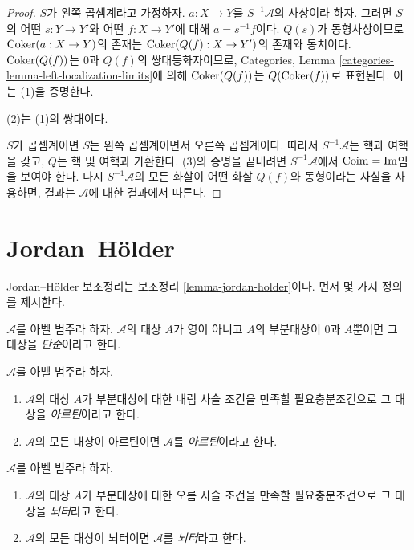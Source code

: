 \begin{proof}
$S$가 왼쪽 곱셈계라고 가정하자.
$a : X \to Y$를 $S^{-1}\mathcal{A}$의 사상이라 하자.
그러면 $S$의 어떤 $s : Y \to Y'$와 어떤 $f : X \to Y'$에 대해
$a = s^{-1}f$이다. $Q(s)$가 동형사상이므로
$\mathop{\mathrm{Coker}}(a : X \to Y)$의 존재는 $\mathop{\mathrm{Coker}}(Q(f) : X \to Y')$의 존재와
동치이다. $\mathop{\mathrm{Coker}}(Q(f))$는 $0$과 $Q(f)$의 쌍대등화자이므로,
Categories, Lemma
\ref{categories-lemma-left-localization-limits}에 의해
$\mathop{\mathrm{Coker}}(Q(f))$는 $Q(\mathop{\mathrm{Coker}}(f))$로 표현된다. 이는 (1)을 증명한다.

\medskip\noindent
(2)는 (1)의 쌍대이다.

\medskip\noindent
$S$가 곱셈계이면 $S$는 왼쪽 곱셈계이면서 오른쪽 곱셈계이다.
따라서 $S^{-1}\mathcal{A}$는 핵과 여핵을 갖고, $Q$는 핵 및 여핵과
가환한다. (3)의 증명을 끝내려면 $S^{-1}\mathcal{A}$에서
$\mathop{\mathrm{Coim}} = \mathop{\mathrm{Im}}$임을 보여야 한다. 다시 $S^{-1}\mathcal{A}$의 모든 화살이
어떤 화살 $Q(f)$와 동형이라는 사실을 사용하면, 결과는
$\mathcal{A}$에 대한 결과에서 따른다.
\end{proof}




\section{Jordan--H\"older}
\label{section-jordan-holder}

\noindent
Jordan--H\"older 보조정리는 보조정리 \ref{lemma-jordan-holder}이다.
먼저 몇 가지 정의를 제시한다.

\begin{definition}
\label{definition-simple}
$\mathcal{A}$를 아벨 범주라 하자. $\mathcal{A}$의 대상 $A$가 영이
아니고 $A$의 부분대상이 $0$과 $A$뿐이면 그 대상을 {\it 단순}이라고 한다.
\end{definition}

\begin{definition}
\label{definition-Artinian}
$\mathcal{A}$를 아벨 범주라 하자.
\begin{enumerate}
\item $\mathcal{A}$의 대상 $A$가 부분대상에 대한 내림 사슬 조건을
만족할 필요충분조건으로 그 대상을 {\it 아르틴}이라고 한다.
\item $\mathcal{A}$의 모든 대상이 아르틴이면 $\mathcal{A}$를
{\it 아르틴}이라고 한다.
\end{enumerate}
\end{definition}

\begin{definition}
\label{definition-Noetherian}
$\mathcal{A}$를 아벨 범주라 하자.
\begin{enumerate}
\item $\mathcal{A}$의 대상 $A$가 부분대상에 대한 오름 사슬 조건을
만족할 필요충분조건으로 그 대상을 {\it 뇌터}라고 한다.
\item $\mathcal{A}$의 모든 대상이 뇌터이면 $\mathcal{A}$를
{\it 뇌터}라고 한다.
\end{enumerate}
\end{definition}


